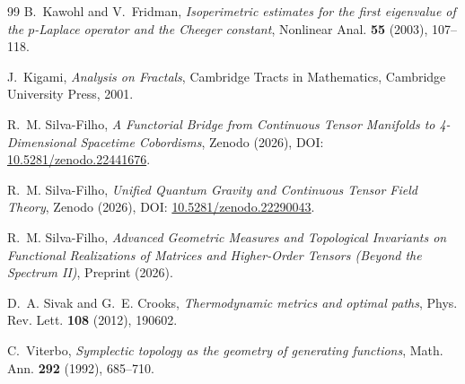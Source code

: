 \documentclass[11pt,a4paper,reqno]{amsart}
\theoremstyle{definition}
\theoremstyle{remark}
\numberwithin{equation}{section}
\begin{document}
\begin{thebibliography}{99}
B.~Kawohl and V.~Fridman,
\emph{Isoperimetric estimates for the first eigenvalue of the $p$-Laplace operator and the Cheeger constant},
Nonlinear Anal. \textbf{55} (2003), 107--118.

J.~Kigami,
\emph{Analysis on Fractals},
Cambridge Tracts in Mathematics, Cambridge University Press, 2001.

R.~M. Silva-Filho,
\emph{A Functorial Bridge from Continuous Tensor Manifolds to 4-Dimensional Spacetime Cobordisms},
Zenodo (2026), DOI: \href{https://doi.org/10.5281/zenodo.22441676}{10.5281/zenodo.22441676}.

R.~M. Silva-Filho,
\emph{Unified Quantum Gravity and Continuous Tensor Field Theory},
Zenodo (2026), DOI: \href{https://doi.org/10.5281/zenodo.22290043}{10.5281/zenodo.22290043}.

R.~M. Silva-Filho,
\emph{Advanced Geometric Measures and Topological Invariants on Functional Realizations of Matrices and Higher-Order Tensors (Beyond the Spectrum II)},
Preprint (2026).

D.~A. Sivak and G.~E. Crooks,
\emph{Thermodynamic metrics and optimal paths},
Phys. Rev. Lett. \textbf{108} (2012), 190602.

C.~Viterbo,
\emph{Symplectic topology as the geometry of generating functions},
Math. Ann. \textbf{292} (1992), 685--710.

\end{thebibliography}
\end{document}
